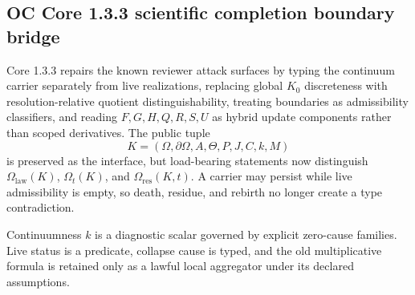 
\subsection{OC Core 1.3.3 scientific completion boundary bridge}
\label{sec:oc133-scientific-closure-bridge}

Core 1.3.3 repairs the known reviewer attack surfaces by typing the continuum
carrier separately from live realizations, replacing global \(K_0\)
discreteness with resolution-relative quotient distinguishability, treating
boundaries as admissibility classifiers, and reading \(F,G,H,Q,R,S,U\) as
hybrid update components rather than scoped derivatives.  The public tuple
\[
K=(\Omega,\partial\Omega,A,\Theta,P,J,C,k,M)
\]
is preserved as the interface, but load-bearing statements now distinguish
\(\Omega_{\mathrm{law}}(K)\), \(\Omega_t(K)\), and
\(\Omega_{\mathrm{res}}(K,t)\).  A carrier may persist while live admissibility
is empty, so death, residue, and rebirth no longer create a type contradiction.

Continuumness \(k\) is a diagnostic scalar governed by explicit zero-cause
families.  Live status is a predicate, collapse cause is typed, and the old
multiplicative formula is retained only as a lawful local aggregator under its
declared assumptions.
